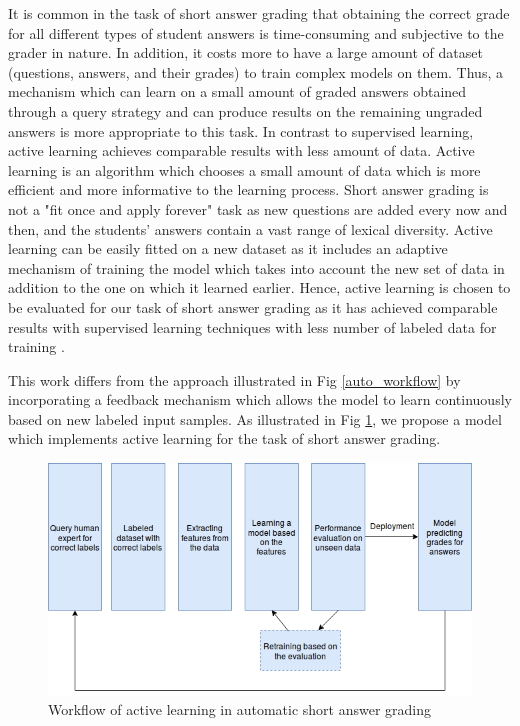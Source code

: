 It is common in the task of short answer grading that obtaining the correct grade for all different types of student answers is time-consuming and subjective to the grader in nature. In addition, it costs more to have a large amount of dataset (questions, answers, and their grades) to train complex models on them. Thus, a mechanism which can learn on a small amount of graded answers obtained through a query strategy and can produce results on the remaining ungraded answers is more appropriate to this task. In contrast to supervised learning, active learning achieves comparable results with less amount of data. Active learning is an algorithm which chooses a small amount of data which is more efficient and more informative to the learning process. Short answer grading is not a "fit once and apply forever" task as new questions are added every now and then, and the students' answers contain a vast range of lexical diversity. Active learning can be easily fitted on a new dataset as it includes an adaptive mechanism of training the model which takes into account the new set of data in addition to the one on which it learned earlier. Hence, active learning is chosen to be evaluated for our task of short answer grading as it has achieved comparable results with supervised learning techniques with less number of labeled data for training \cite{yang2009effective}. 

This work differs from the approach illustrated in Fig \ref{auto_workflow} by incorporating a feedback mechanism which allows the model to learn continuously based on new labeled input samples. As illustrated in Fig \ref{ac_simple_workflow}, we propose a model which implements active learning for the task of short answer grading.

\vspace{5mm}

\begin{figure}[h]
	\centering
	\includegraphics[scale=0.6]{images/simpler_model_ac}
	\caption{Workflow of active learning in automatic short answer grading} %
	\label{ac_simple_workflow}
\end{figure}


